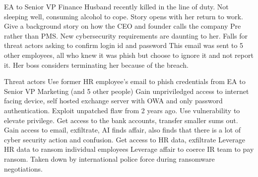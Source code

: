 EA to Senior VP Finance
Husband recently killed in the line of duty.
Not sleeping well, consuming alcohol to cope.
Story opens with her return to work. Give a background story on how the CEO and founder calls the company Pre rather than PMS.
New cybersecurity requirements are daunting to her.
Falls for threat actors asking to confirm login id and password
This email was sent to 5 other employees, all who knew it was phish but choose to ignore it and not report it.
Her boss considers terminating her because of the breach.

Threat actors
Use former HR employee’s email to phish credentials from EA to Senior VP Marketing (and 5 other people)
Gain unpriviledged access to internet facing device, self hosted exchange server with OWA and only password authentication.
Exploit unpatched flaw from 2 years ago.
Use vulnerability to elevate privilege.
Get access to the bank accounts, transfer smaller sums out.
Gain access to email, exfiltrate, AI finds affair, also finds that there is a lot of cyber security action and confusion.
Get access to HR data, exfiltrate
Leverage HR data to ransom individual employees
Leverage affair to coerce IR team to pay ransom.
Taken down by international police force during ransomware negotiations.



